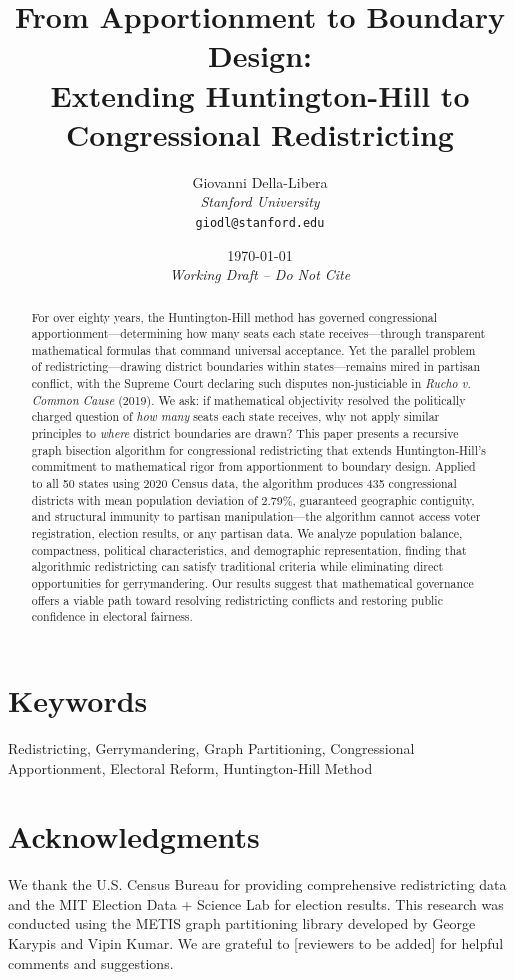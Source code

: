 \documentclass[12pt]{article}
\title{\textbf{From Apportionment to Boundary Design:\\
Extending Huntington-Hill to Congressional Redistricting}}
\author{
Giovanni Della-Libera\\
\textit{Stanford University}\\
\texttt{giodl@stanford.edu}
}
\date{\today\\[0.5cm]\textit{Working Draft -- Do Not Cite}}
\begin{document}
\maketitle

\begin{abstract}
For over eighty years, the Huntington-Hill method has governed congressional apportionment—determining how many seats each state receives—through transparent mathematical formulas that command universal acceptance. Yet the parallel problem of redistricting—drawing district boundaries within states—remains mired in partisan conflict, with the Supreme Court declaring such disputes non-justiciable in \textit{Rucho v. Common Cause} (2019). We ask: if mathematical objectivity resolved the politically charged question of \textit{how many} seats each state receives, why not apply similar principles to \textit{where} district boundaries are drawn? This paper presents a recursive graph bisection algorithm for congressional redistricting that extends Huntington-Hill's commitment to mathematical rigor from apportionment to boundary design. Applied to all 50 states using 2020 Census data, the algorithm produces 435 congressional districts with mean population deviation of 2.79\%, guaranteed geographic contiguity, and structural immunity to partisan manipulation—the algorithm cannot access voter registration, election results, or any partisan data. We analyze population balance, compactness, political characteristics, and demographic representation, finding that algorithmic redistricting can satisfy traditional criteria while eliminating direct opportunities for gerrymandering. Our results suggest that mathematical governance offers a viable path toward resolving redistricting conflicts and restoring public confidence in electoral fairness.
\end{abstract}

\section*{Keywords}
Redistricting, Gerrymandering, Graph Partitioning, Congressional Apportionment, Electoral Reform, Huntington-Hill Method









\section*{Acknowledgments}
We thank the U.S. Census Bureau for providing comprehensive redistricting data and the MIT Election Data + Science Lab for election results. This research was conducted using the METIS graph partitioning library developed by George Karypis and Vipin Kumar. We are grateful to [reviewers to be added] for helpful comments and suggestions.



\end{document}
